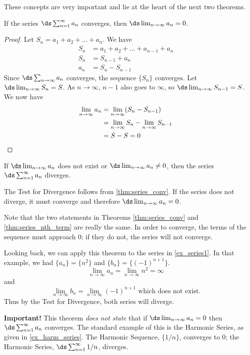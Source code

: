 These concepts are very important and lie at the heart of the next two theorems.

\begin{theorem}\label{thm:series_conv}
If the series $\ds \sum_{n=1}^\infty a_n$ converges, then $\ds\lim_{n\to\infty}a_n=0$.
\end{theorem}

\begin{proof}
Let $S_n=a_1+a_2+\dots+a_n$. We have 
\begin{align*}
S_n&=a_1+a_2+\dots+a_{n-1}+a_n\\
S_n&=S_{n-1}+a_n\\
a_n&=S_n-S_{n-1}
\end{align*}
Since  $\ds \sum_{n\to\infty}a_n$ converges, the sequence $\{ S_n\}$ converges.  Let $\ds \lim_{n\to\infty} S_n=S$. As $n\to \infty$, $n-1$ also goes to $\infty$, so $\ds \lim_{n\to\infty} S_{n-1}=S$. We now have
\begin{align*}
\lim_{n\to\infty} a_n&= \lim_{n\to\infty}(S_n-S_{n-1})\\
&= \lim_{n\to\infty}S_n - \lim_{n\to\infty} S_{n-1}\\
&=S-S=0\qedhere
\end{align*}
\end{proof}

\begin{theorem}\label{thm:series_nth_term}
If $ \ds \lim_{n\to\infty} a_n$ does not exist or $\ds  \lim_{n\to\infty}a_n\neq0$, then the series $\ds \sum_{n=1}^\infty a_n$ diverges.
\end{theorem}

The Test for Divergence follows from \autoref{thm:series_conv}. If the series does not diverge, it must converge and therefore $\ds  \lim_{n\to\infty}a_n=0$.

Note that the two statements in Theorems \ref{thm:series_conv} and \ref{thm:series_nth_term} are really the same. In order to converge, the terms of the sequence must approach 0; if they do not, the series will not converge. 

Looking back, we can apply this theorem to the series in \autoref{ex_series1}. In that example, we had $\{a_n\} = \{n^2\}$ and $\{b_n\} = \{(-1)^{n+1}\}$.
\[\lim_{n\to\infty} a_n=\lim_{n\to\infty} n^2=\infty\]
and
\[\lim_{n\to\infty} b_n=\lim_{n\to\infty}(-1)^{n+1}\text{ which does not exist.}\]
Thus by the Test for Divergence, both series will diverge.

\textbf{Important!} This theorem \emph{does not state} that if $\ds \lim_{n\to\infty} a_n = 0$ then $\ds \sum_{n=1}^\infty  a_n $ converges. The standard example of this is the Harmonic Series, as given in \autoref{ex_harm_series}. The Harmonic Sequence, $\{1/n\}$, converges to 0; the Harmonic Series, $\ds \sum_{n=1}^\infty 1/n$, diverges.

